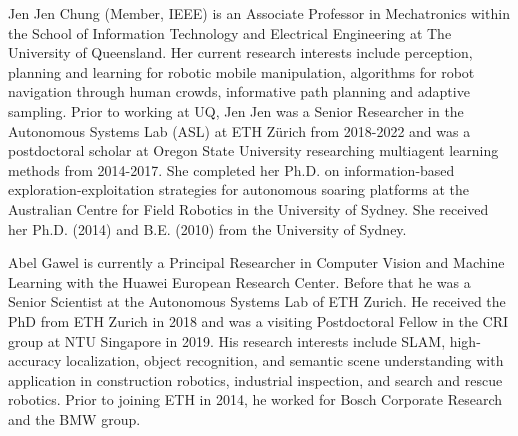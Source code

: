 \documentclass[journal]{IEEEtran}  %
\begin{document}
\begin{IEEEbiography}{Jen Jen Chung}
(Member, IEEE) is an Associate Professor in Mechatronics within the School of Information Technology and Electrical Engineering at The University of Queensland. Her current research interests include perception, planning and learning for robotic mobile manipulation, algorithms for robot navigation through human crowds, informative path planning and adaptive sampling. Prior to working at UQ, Jen Jen was a Senior Researcher in the Autonomous Systems Lab (ASL) at ETH Zürich from 2018-2022 and was a postdoctoral scholar at Oregon State University researching multiagent learning methods from 2014-2017. She completed her Ph.D. on information-based exploration-exploitation strategies for autonomous soaring platforms at the Australian Centre for Field Robotics in the University of Sydney. She received her Ph.D. (2014) and B.E. (2010) from the University of Sydney.
\end{IEEEbiography}
\vspace{-1cm}
\begin{IEEEbiography}{Abel Gawel} is currently a Principal Researcher in Computer Vision and Machine Learning with the Huawei European Research Center. Before that he was a Senior Scientist at the Autonomous Systems Lab of ETH Zurich. He received the PhD from ETH Zurich in 2018 and was a visiting Postdoctoral Fellow in the CRI group at NTU Singapore in 2019. His research interests include SLAM, high-accuracy localization, object recognition, and semantic scene understanding with application in construction robotics, industrial inspection, and search and rescue robotics. Prior to joining ETH in 2014, he worked for Bosch Corporate Research and the BMW group.
\end{IEEEbiography}
\end{document}
